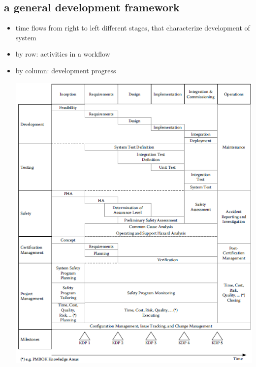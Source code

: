 \documentclass[a4paper, 10pt]{article}
\begin{document}
\subsection*{a general development framework}
\begin{itemize}
    \item time flows from right to left \follows different stages, that characterize development of system
    \item by row: activities in a workflow
    \item by column: development progress
    \begin{center}
        \includegraphics[width=\linewidth]{images/genDev.png}
    \end{center}
\end{itemize}
\end{document}

